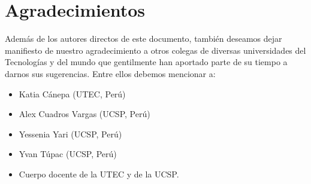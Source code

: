 \chapter*{Agradecimientos}\label{chap:cs-ack}
%

Además de los autores directos de este documento, también deseamos dejar manifiesto de nuestro 
agradecimiento a otros colegas de diversas universidades del Tecnologías y del mundo que gentilmente 
han aportado parte de su tiempo a darnos sus sugerencias. Entre ellos debemos mencionar a:

\begin{itemize}
\item Katia Cánepa (UTEC, Perú)
\item Alex Cuadros Vargas (UCSP, Perú)
\item Yessenia Yari (UCSP, Perú)
\item Yvan Túpac (UCSP, Perú)
\item Cuerpo docente de la UTEC y de la UCSP.
\end{itemize}

